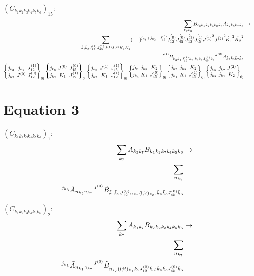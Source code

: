 \documentclass[11pt]{article}
\newcommand{\sixj}[6]{\begingroup\setlength{\arraycolsep}{0.2em}\begin{Bmatrix} #1 & #2 & #3 \\ #4 & #5 & #6 \end{Bmatrix}_{\text{6j}}\endgroup}
\begin{document}
$\left({C}_{{k}_{1}{k}_{2}{k}_{3}{k}_{4}{k}_{5}{k}_{6}}\right)_{15}$:
\begin{align}
-\sum_{{k}_{7}{k}_{8}}{B}_{{k}_{3}{k}_{1}{k}_{7}{k}_{4}{k}_{8}{k}_{6}}{A}_{{k}_{2}{k}_{8}{k}_{7}{k}_{5}}&\rightarrow \notag \\\sum_{\tilde{k}_{7}\tilde{k}_{8}J^{(1)}_{12}J^{(1)}_{45}J^{(1)}J^{(2)}K_{1}K_{2}}(-1)^{j_{{k}_{1}} +j_{{k}_{2}} +J^{(0)}_{12} }\hat{J^{(0)}_{12}}\hat{J^{(0)}_{45}}\hat{J^{(1)}_{12}}\hat{J^{(1)}_{45}}\hat{J^{(1)}}^{2}\hat{J^{(2)}}^{2}\hat{K_{1}}^{2}\hat{K_{2}}^{2}& \notag \\{}^{J^{(1)}}\tilde{B}_{\tilde{k}_{3}\tilde{k}_{1}J^{(1)}_{12}\tilde{k}_{7};\tilde{k}_{4}\tilde{k}_{8}J^{(1)}_{45}\tilde{k}_{6}}{}^{J^{(2)}}\tilde{A}_{\tilde{k}_{2}\tilde{k}_{8}\tilde{k}_{7}\tilde{k}_{5}}& \notag \\\sixj{j_{{k}_{3}}}{j_{{k}_{1}}}{J^{(1)}_{12}}{j_{{k}_{2}}}{J^{(0)}}{J^{(0)}_{12}}\sixj{j_{{k}_{6}}}{J^{(0)}}{J^{(0)}_{45}}{j_{{k}_{2}}}{K_{1}}{J^{(1)}_{12}}\sixj{j_{{k}_{6}}}{J^{(1)}}{J^{(1)}_{45}}{j_{{k}_{7}}}{K_{1}}{J^{(1)}_{12}}\sixj{j_{{k}_{2}}}{j_{{k}_{5}}}{K_{2}}{j_{{k}_{4}}}{K_{1}}{J^{(0)}_{45}}\sixj{j_{{k}_{7}}}{j_{{k}_{8}}}{K_{2}}{j_{{k}_{4}}}{K_{1}}{J^{(1)}_{45}}\sixj{j_{{k}_{5}}}{j_{{k}_{7}}}{J^{(2)}}{j_{{k}_{8}}}{j_{{k}_{2}}}{K_{2}}
\end{align}

\section{Equation 3}
$\left({C}_{{k}_{1}{k}_{2}{k}_{3}{k}_{4}{k}_{5}{k}_{6}}\right)_{1}$:
\begin{align}
\sum_{{k}_{7}}{A}_{{k}_{3}{k}_{7}}{B}_{{k}_{1}{k}_{2}{k}_{7}{k}_{4}{k}_{5}{k}_{6}}&\rightarrow \notag \\\sum_{n_{{k}_{7}}}& \notag \\{}^{j_{{k}_{3}}}\tilde{A}_{n_{{k}_{3}}n_{{k}_{7}}}{}^{J^{(0)}}\tilde{B}_{\tilde{k}_{1}\tilde{k}_{2}J^{(0)}_{12}n_{{k}_{7}}(ljt)_{{k}_{3}};\tilde{k}_{4}\tilde{k}_{5}J^{(0)}_{45}\tilde{k}_{6}}& \notag \\
\end{align}

$\left({C}_{{k}_{1}{k}_{2}{k}_{3}{k}_{4}{k}_{5}{k}_{6}}\right)_{2}$:
\begin{align}
\sum_{{k}_{7}}{A}_{{k}_{1}{k}_{7}}{B}_{{k}_{7}{k}_{2}{k}_{3}{k}_{4}{k}_{5}{k}_{6}}&\rightarrow \notag \\\sum_{n_{{k}_{7}}}& \notag \\{}^{j_{{k}_{1}}}\tilde{A}_{n_{{k}_{1}}n_{{k}_{7}}}{}^{J^{(0)}}\tilde{B}_{n_{{k}_{7}}(ljt)_{{k}_{1}}\tilde{k}_{2}J^{(0)}_{12}\tilde{k}_{3};\tilde{k}_{4}\tilde{k}_{5}J^{(0)}_{45}\tilde{k}_{6}}& \notag \\
\end{align}
\end{document}
